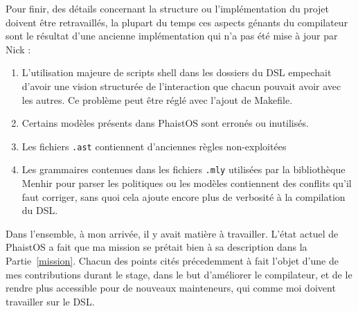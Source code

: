 Pour finir, des détails concernant la structure ou l'implémentation du projet 
doivent être retravaillés, la plupart du temps ces aspects génants du 
compilateur sont le résultat d'une ancienne implémentation qui n'a pas été mise 
à jour par Nick :
\begin{enumerate}
    \item L'utilisation majeure de scripts shell dans les dossiers du DSL 
    empechait d'avoir une vision structurée de l'interaction que chacun pouvait 
    avoir avec les autres. Ce problème peut être réglé avec l'ajout de Makefile.
    \item Certains modèles présents dans PhaistOS sont erronés ou inutilisés.
    \item Les fichiers \texttt{.ast} contiennent d'anciennes règles 
    non-exploitées
    \item Les grammaires contenues dans les fichiers \texttt{.mly} utilisées 
    par la bibliothèque Menhir pour parser les politiques ou les modèles 
    contiennent des conflits qu'il faut corriger, sans quoi cela ajoute encore 
    plus de verbosité à la compilation du DSL.
\end{enumerate}

Dans l'ensemble, à mon arrivée, il y avait matière à travailler. L'état actuel 
de PhaistOS a fait que ma mission se prétait bien à sa description dans la 
Partie~\ref{mission}. Chacun des points cités précedemment à fait l'objet d'une 
de mes contributions durant le stage, dans le but d'améliorer le compilateur, 
et de le rendre plus accessible pour de nouveaux mainteneurs, qui comme moi 
doivent travailler sur le DSL.
